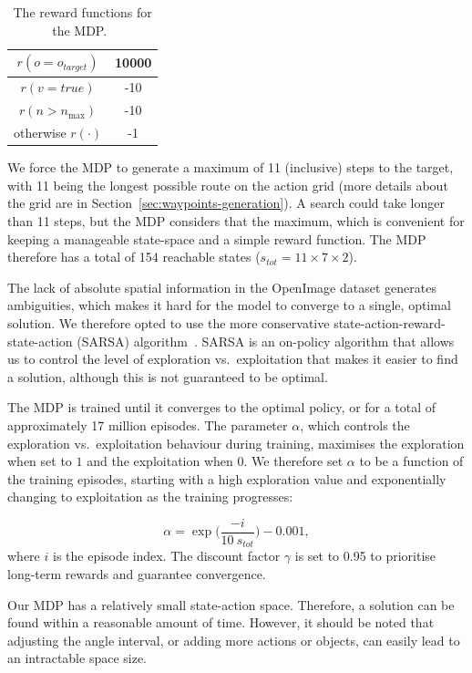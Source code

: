 \documentclass[a4paper, twoside]{article}
\begin{document}
\begin{table}
  \centering
  \caption{The reward functions for the MDP.\ }\label{tab:rewards}
  \begin{tabular}{cc}
    \toprule
    $r(o = o_{target})$ & 10000 \\ \midrule
    $r(v = true)$  & -10 \\ \midrule
    $r(n > n_{\max})$ & -10 \\ \midrule
    otherwise $r(\cdot)$ & -1  \\ \midrule
    \bottomrule
  \end{tabular}
\end{table}

We force the MDP to generate a maximum of 11 (inclusive) steps to the target, with 11 being the longest possible route on the action grid (more details about the grid are in Section~\ref{sec:waypoints-generation}). A search could take longer than 11 steps, but the MDP considers that the maximum, which is convenient for keeping a manageable state-space and a simple reward function. The MDP therefore has a total of 154 reachable states ($s_{tot}=11\times7\times2$).

The lack of absolute spatial information in the OpenImage dataset generates ambiguities, which makes it hard for the model to converge to a single, optimal solution. We therefore opted to use the more conservative state-action-reward-state-action (SARSA) algorithm~\cite{rummery1994line}. SARSA is an on-policy algorithm that allows us to control the level of exploration vs.\ exploitation that makes it easier to find a solution, although this is not guaranteed to be optimal. 

The MDP is trained until it converges to the optimal policy, or for a total of approximately 17 million episodes. The parameter $\alpha$, which controls the exploration vs.\ exploitation behaviour during training, maximises the exploration when set to $1$ and the exploitation when $0$. We therefore set $\alpha$ to be a function of the training episodes, starting with a high exploration value and exponentially changing to exploitation as the training progresses: 

\begin{equation}
  \alpha = \exp\Big(\frac{-i}{10~s_{tot}}\Big) - 0.001,
\end{equation}
where $i$ is the episode index. The discount factor $\gamma$ is set to 0.95 to prioritise long-term rewards and guarantee convergence. 

Our MDP has a relatively small state-action space. Therefore, a solution can be found within a reasonable amount of time. However, it should be noted that adjusting the angle interval, or adding more actions or objects, can easily lead to an intractable space size. 
\end{document}
